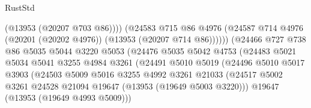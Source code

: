 \begin{lexlean}{RustStd}
\begin{coremodule}
                                          (@13953 (@20207 @703 @86))))
                                      (@24583
                                        @715
                                        @86
                                        @4976
                                        (@24587
                                          @714
                                          @4976
                                          (@20201 (@20202 @4976))
                                          (@13953 (@20207 @714 @86))))))
                                  (@24466
                                    @727
                                    @738
                                    @86
                                    @5035
                                    @5044
                                    @3220
                                    @5053
                                    (@24476
                                      @5035
                                      @5042
                                      @4753
                                      (@24483
                                        @5021
                                        @5034
                                        @5041
                                        @3255
                                        @4984
                                        @3261
                                        (@24491
                                          @5010
                                          @5019
                                          (@24496
                                            @5010
                                            @5017
                                            @3903
                                            (@24503
                                              @5009
                                              @5016
                                              @3255
                                              @4992
                                              @3261
                                              @21033
                                              (@24517
                                                @5002
                                                @3261
                                                @24528
                                                @21094
                                                @19647
                                                (@13953 (@19649 @5003 @3220)))
                                              @19647
                                              (@13953 (@19649 @4993 @5009)))

\end{coremodule}
\end{lexlean}
